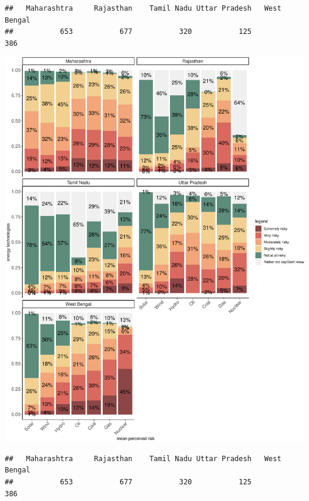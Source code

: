 \documentclass[
]{article}
\begin{document}
\begin{verbatim}
##   Maharashtra     Rajasthan    Tamil Nadu Uttar Pradesh   West Bengal 
##           653           677           320           125           386
\end{verbatim}

\includegraphics[width=0.7\linewidth,height=0.7\textheight]{Significant_results_files/figure-latex/unnamed-chunk-8-1}

\newpage

\begin{verbatim}
##   Maharashtra     Rajasthan    Tamil Nadu Uttar Pradesh   West Bengal 
##           653           677           320           125           386
\end{verbatim}
\end{document}
